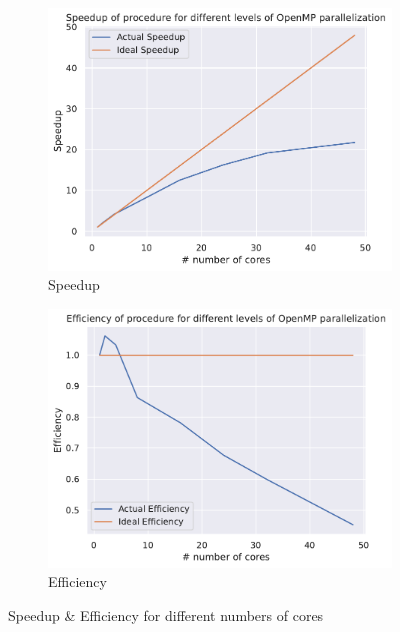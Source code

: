 \documentclass{scrartcl}
\begin{document}
	\begin{figure}[h]
		\centering
		\begin{subfigure}[b]{0.49\textwidth}
			\centering
			\includegraphics[width=\textwidth]{../plots/q4-speedup}
			\caption{Speedup}
			\label{fig:q4-speedup}
		\end{subfigure}
		\hfill
		\begin{subfigure}[b]{0.49\textwidth}
			\centering
			\includegraphics[width=\textwidth]{../plots/q4-efficiency}
			\caption{Efficiency}
			\label{fig:q4-efficiency}
		\end{subfigure}
		\caption{Speedup \& Efficiency for different numbers of cores}
		\label{fig:q4}
	\end{figure}
	
\end{document}
